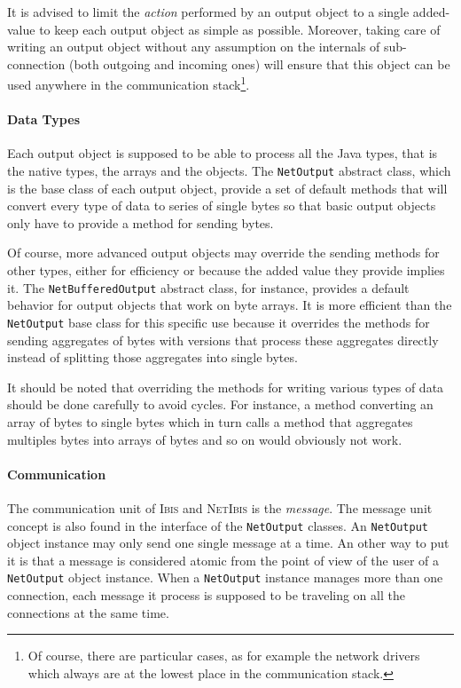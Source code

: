 \documentclass[11pt]{book}
\def\Ibis{\textsc{Ibis}\xspace}
\def\NetIbis{\textsc{NetIbis}\xspace}
\begin{document}
It is advised to limit the \emph{action} performed by an output object
to a single added-value to keep each output object as simple as
possible. Moreover, taking care of writing an output object without
any assumption on the internals of sub-connection (both outgoing and
incoming ones) will ensure that this object can be used anywhere in
the communication stack\footnote{Of course, there are particular
  cases, as for example the network drivers which always are at the
  lowest place in the communication stack.}.


\paragraph{Data Types}
\label{sec:data-types}

Each output object is supposed to be able to process all the Java
types, that is the native types, the arrays and the objects. The
\texttt{NetOutput} abstract class, which is the base class of each
output object, provide a set of default methods that will convert
every type of data to series of single bytes so that basic output
objects only have to provide a method for sending bytes.

Of course, more advanced output objects may override the sending
methods for other types, either for efficiency or because the added
value they provide implies it. The \texttt{NetBufferedOutput} abstract
class, for instance, provides a default behavior for output objects
that work on byte arrays. It is more efficient than the
\texttt{NetOutput} base class for this specific use because it
overrides the methods for sending aggregates of bytes with versions
that process these aggregates directly instead of splitting those
aggregates into single bytes.

It should be noted that overriding the methods for writing various
types of data should be done carefully to avoid cycles. For instance,
a method converting an array of bytes to single bytes which in turn
calls a method that aggregates multiples bytes into arrays of bytes
and so on would obviously not work.


\paragraph{Communication}
\label{sec:communication}

The communication unit of \Ibis and \NetIbis is the \emph{message}.
The message unit concept is also found in the interface of the
\texttt{NetOutput} classes. An \texttt{NetOutput} object instance may
only send one single message at a time. An other way to put it is that
a message is considered atomic from the point of view of the user of a
\texttt{NetOutput} object instance. When a \texttt{NetOutput} instance
manages more than one connection, each message it process is supposed
to be traveling on all the connections at the same time.
\end{document}
